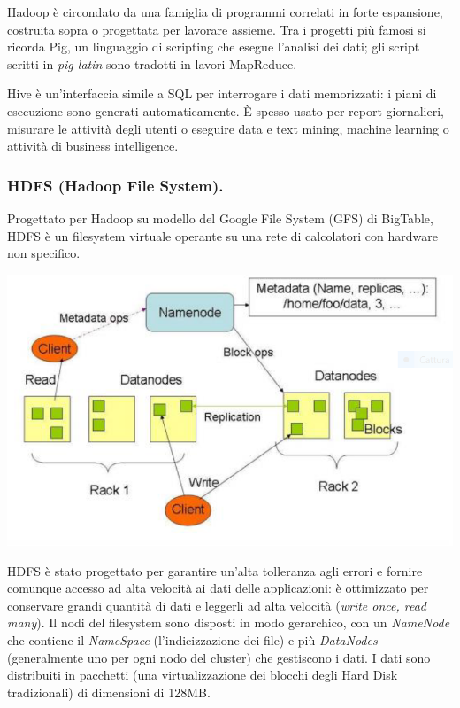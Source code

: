 \documentclass[a4page, 11pt]{article}
\begin{document}
Hadoop è circondato da una famiglia di programmi correlati in forte espansione, costruita sopra o progettata per lavorare assieme.
Tra i progetti più famosi si ricorda Pig, un linguaggio di scripting che esegue l'analisi dei dati; gli script scritti in \textit{pig latin} sono tradotti in lavori MapReduce.

Hive è un'interfaccia simile a SQL per interrogare i dati memorizzati: i piani di esecuzione sono generati automaticamente.
È spesso usato per report giornalieri, misurare le attività degli utenti o eseguire data e text mining, machine learning o attività di business intelligence.

\subsubsection{HDFS (Hadoop File System).}
Progettato per Hadoop su modello del Google File System (GFS) di BigTable, HDFS è un filesystem virtuale operante su una rete di calcolatori con hardware non specifico.
\begin{center}
  \includegraphics[scale=0.70]{IMAGE7.png}
\end{center}

HDFS è stato progettato per garantire un'alta tolleranza agli errori e fornire comunque accesso ad alta velocità ai dati delle applicazioni: è ottimizzato per conservare grandi quantità di dati e leggerli ad alta velocità (\textit{write once, read many}).
Il nodi del filesystem sono disposti in modo gerarchico, con un \textit{NameNode} che contiene il \textit{NameSpace} (l'indicizzazione dei file) e più \textit{DataNodes} (generalmente uno per ogni nodo del cluster) che gestiscono i dati.
I dati sono distribuiti in pacchetti (una virtualizzazione dei blocchi degli Hard Disk tradizionali) di dimensioni di 128MB.
\end{document}
